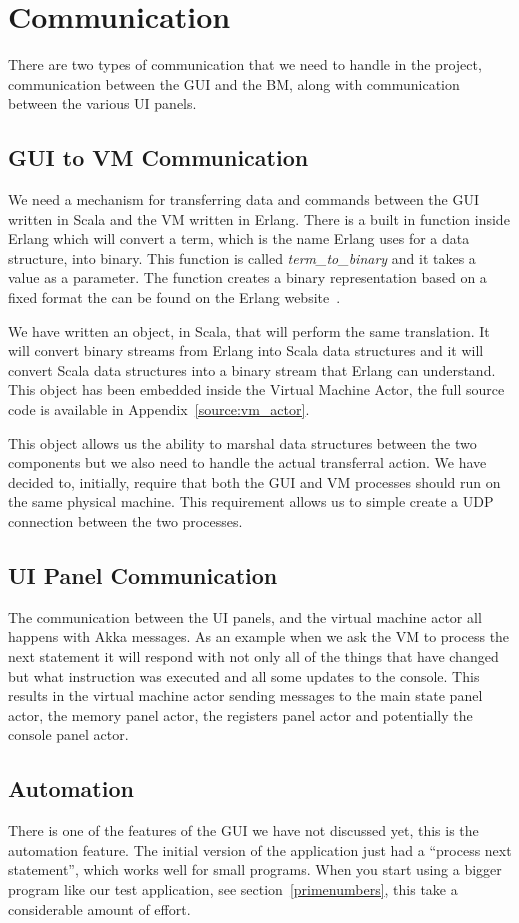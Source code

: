 \documentclass[a4paper,11pt]{report}
\begin{document}
\section{Communication}
There are two types of communication that we need to handle in the project, communication between the GUI and the BM, along with communication between the various UI panels.
\subsection{GUI to VM Communication}
We need a mechanism for transferring data and commands between the GUI written in Scala and the VM written in Erlang. There is a built in function inside Erlang which will convert a term, which is the name Erlang uses for a data structure, into binary. This function is called \textit{term\_to\_binary} and it takes a value as a parameter. The function creates a binary representation based on a fixed format the can be found on the Erlang website~\cite{term_to_binary}.

We have written an object, in Scala, that will perform the same translation. It will convert binary streams from Erlang into Scala data structures and it will convert Scala data structures into a binary stream that Erlang can understand. This object has been embedded inside the Virtual Machine Actor, the full source code is available in Appendix~\ref{source:vm_actor}.

This object allows us the ability to marshal data structures between the two components but we also need to handle the actual transferral action. We have decided to, initially, require that both the GUI and VM processes should run on the same physical machine. This requirement allows us to simple create a UDP connection between the two processes.
\subsection{UI Panel Communication}
The communication between the UI panels, and the virtual machine actor all happens with Akka messages. As an example when we ask the VM to process the next statement it will respond with not only all of the things that have changed but what instruction was executed and all some updates to the console. This results in the virtual machine actor sending messages to the main state panel actor, the memory panel actor, the registers panel actor and potentially the console panel actor.
\subsection{Automation}
There is one of the features of the GUI we have not discussed yet, this is the automation feature. The initial version of the application just had a ``process next statement'', which works well for small programs. When you start using a bigger program like our test application, see section~\ref{primenumbers}, this take a considerable amount of effort.
\end{document}
